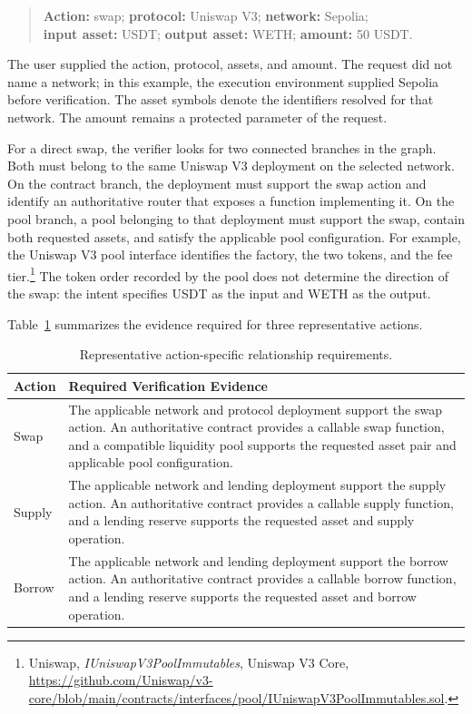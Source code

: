 \begin{quote}
\small
\textbf{Action:} swap; \textbf{protocol:} Uniswap V3;
\textbf{network:} Sepolia;\\
\textbf{input asset:} USDT; \textbf{output asset:} WETH;
\textbf{amount:} 50 USDT.
\end{quote}

The user supplied the action, protocol, assets, and amount. The request
did not name a network; in this example, the execution environment supplied
Sepolia before verification. The asset symbols denote the identifiers
resolved for that network. The amount remains a protected parameter of the
request.

For a direct swap, the verifier looks for two connected branches in the
graph. Both must belong to the same Uniswap V3 deployment on the selected
network. On the contract branch, the deployment must support the swap
action and identify an authoritative router that exposes a function
implementing it. On the pool branch, a pool belonging to that deployment
must support the swap, contain both requested assets, and satisfy the
applicable pool configuration. For example, the Uniswap V3 pool interface
identifies the factory, the two tokens, and the fee tier.\footnote{Uniswap,
\textit{IUniswapV3PoolImmutables}, Uniswap V3 Core,
\url{https://github.com/Uniswap/v3-core/blob/main/contracts/interfaces/pool/IUniswapV3PoolImmutables.sol}.}
The token order recorded by the pool does not determine the direction
of the swap: the intent specifies USDT as the input and WETH as the output.

Table~\ref{tab:verification_patterns} summarizes the evidence required for
three representative actions.

\begin{table}[H]
\centering
\caption{Representative action-specific relationship requirements.}
\label{tab:verification_patterns}

\small

\begin{tabular}{p{} p{}}
\hline
\textbf{Action} & \textbf{Required Verification Evidence} \\
\hline

Swap &
The applicable network and protocol deployment support the swap action.
An authoritative contract provides a callable swap function, and a
compatible liquidity pool supports the requested asset pair and
applicable pool configuration. \\

Supply &
The applicable network and lending deployment support the supply action.
An authoritative contract provides a callable supply function, and a
lending reserve supports the requested asset and supply operation. \\

Borrow &
The applicable network and lending deployment support the borrow action.
An authoritative contract provides a callable borrow function, and a
lending reserve supports the requested asset and borrow operation. \\

\hline
\end{tabular}
\end{table}

